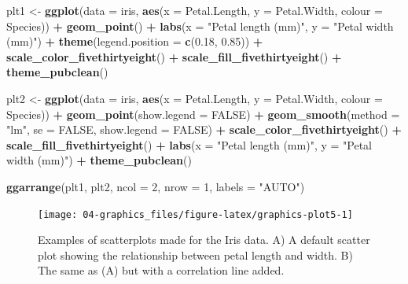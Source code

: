 \documentclass[english,10pt,a4paper,oneside]{book}
\newenvironment{Shaded}{\begin{snugshade}}{\end{snugshade}}
\newcommand{\KeywordTok}[1]{\textcolor[rgb]{0.13,0.29,0.53}{\textbf{#1}}}
\newcommand{\DataTypeTok}[1]{\textcolor[rgb]{0.13,0.29,0.53}{#1}}
\newcommand{\DecValTok}[1]{\textcolor[rgb]{0.00,0.00,0.81}{#1}}
\newcommand{\FloatTok}[1]{\textcolor[rgb]{0.00,0.00,0.81}{#1}}
\newcommand{\StringTok}[1]{\textcolor[rgb]{0.31,0.60,0.02}{#1}}
\newcommand{\OtherTok}[1]{\textcolor[rgb]{0.56,0.35,0.01}{#1}}
\newcommand{\OperatorTok}[1]{\textcolor[rgb]{0.81,0.36,0.00}{\textbf{#1}}}
\newcommand{\NormalTok}[1]{#1}
\theoremstyle{definition}
\theoremstyle{definition}
\theoremstyle{definition}
\theoremstyle{remark}
\begin{document}
\begin{Shaded}
\begin{Highlighting}[]
\NormalTok{plt1 <-}\StringTok{ }\KeywordTok{ggplot}\NormalTok{(}\DataTypeTok{data =}\NormalTok{ iris, }\KeywordTok{aes}\NormalTok{(}\DataTypeTok{x =}\NormalTok{ Petal.Length, }\DataTypeTok{y =}\NormalTok{ Petal.Width, }\DataTypeTok{colour =}\NormalTok{ Species)) }\OperatorTok{+}
\StringTok{  }\KeywordTok{geom_point}\NormalTok{() }\OperatorTok{+}
\StringTok{  }\KeywordTok{labs}\NormalTok{(}\DataTypeTok{x =} \StringTok{"Petal length (mm)"}\NormalTok{, }\DataTypeTok{y =} \StringTok{"Petal width (mm)"}\NormalTok{) }\OperatorTok{+}
\StringTok{  }\KeywordTok{theme}\NormalTok{(}\DataTypeTok{legend.position =} \KeywordTok{c}\NormalTok{(}\FloatTok{0.18}\NormalTok{, }\FloatTok{0.85}\NormalTok{)) }\OperatorTok{+}
\StringTok{  }\KeywordTok{scale_color_fivethirtyeight}\NormalTok{() }\OperatorTok{+}
\StringTok{  }\KeywordTok{scale_fill_fivethirtyeight}\NormalTok{() }\OperatorTok{+}\StringTok{ }
\StringTok{  }\KeywordTok{theme_pubclean}\NormalTok{()}

\NormalTok{plt2 <-}\StringTok{ }\KeywordTok{ggplot}\NormalTok{(}\DataTypeTok{data =}\NormalTok{ iris, }\KeywordTok{aes}\NormalTok{(}\DataTypeTok{x =}\NormalTok{ Petal.Length, }\DataTypeTok{y =}\NormalTok{ Petal.Width, }\DataTypeTok{colour =}\NormalTok{ Species)) }\OperatorTok{+}
\StringTok{  }\KeywordTok{geom_point}\NormalTok{(}\DataTypeTok{show.legend =} \OtherTok{FALSE}\NormalTok{) }\OperatorTok{+}
\StringTok{  }\KeywordTok{geom_smooth}\NormalTok{(}\DataTypeTok{method =} \StringTok{"lm"}\NormalTok{, }\DataTypeTok{se =} \OtherTok{FALSE}\NormalTok{, }\DataTypeTok{show.legend =} \OtherTok{FALSE}\NormalTok{) }\OperatorTok{+}
\StringTok{  }\KeywordTok{scale_color_fivethirtyeight}\NormalTok{() }\OperatorTok{+}
\StringTok{  }\KeywordTok{scale_fill_fivethirtyeight}\NormalTok{() }\OperatorTok{+}
\StringTok{  }\KeywordTok{labs}\NormalTok{(}\DataTypeTok{x =} \StringTok{"Petal length (mm)"}\NormalTok{, }\DataTypeTok{y =} \StringTok{"Petal width (mm)"}\NormalTok{) }\OperatorTok{+}\StringTok{ }
\StringTok{  }\KeywordTok{theme_pubclean}\NormalTok{()}

\KeywordTok{ggarrange}\NormalTok{(plt1, plt2, }\DataTypeTok{ncol =} \DecValTok{2}\NormalTok{, }\DataTypeTok{nrow =} \DecValTok{1}\NormalTok{, }\DataTypeTok{labels =} \StringTok{"AUTO"}\NormalTok{)}
\end{Highlighting}
\end{Shaded}

\begin{figure}
\texttt{[image: 04-graphics\_files/figure-latex/graphics-plot5-1]} \caption{Examples of scatterplots made for the Iris data. A) A default scatter plot showing the relationship between petal length and width. B) The same as (A) but with a correlation line added.}\label{fig:graphics-plot5}
\end{figure}
\end{document}
